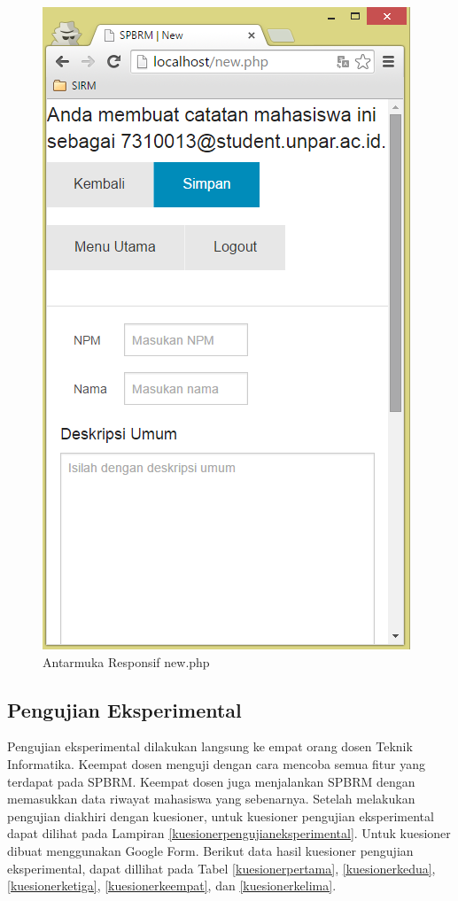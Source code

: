 \begin{figure}[H]
\centering
\includegraphics[scale=0.44]{Gambar/pengujian24.png}
\caption[Antarmuka Responsif new.php]{Antarmuka Responsif new.php} 
\label{fig:responsifnew}
\end{figure}

\subsection{Pengujian Eksperimental}
\label{sec:pengujianeksperimantal}

Pengujian eksperimental dilakukan langsung ke empat orang dosen Teknik Informatika. Keempat dosen menguji dengan cara mencoba semua fitur yang terdapat pada SPBRM. Keempat dosen juga menjalankan SPBRM dengan memasukkan data riwayat mahasiswa yang sebenarnya. Setelah melakukan pengujian diakhiri dengan kuesioner, untuk kuesioner pengujian eksperimental dapat dilihat pada Lampiran \ref{kuesionerpengujianeksperimental}. Untuk kuesioner dibuat menggunakan Google Form. Berikut data hasil kuesioner pengujian eksperimental, dapat dillihat pada Tabel \ref{kuesionerpertama}, \ref{kuesionerkedua}, \ref{kuesionerketiga}, \ref{kuesionerkeempat}, dan \ref{kuesionerkelima}.

